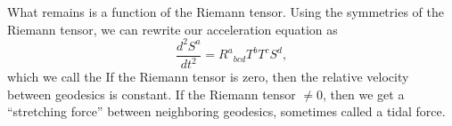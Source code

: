 What remains is a function of the Riemann tensor. Using the symmetries of the Riemann tensor, we can rewrite our acceleration equation as
$$\frac{d^2S^a}{dt^2}={R^a}_{bcd} T^b T^c S^d,$$
which we call the  If the Riemann tensor is zero, then the relative velocity between geodesics is constant. If the Riemann tensor $\neq 0$, then we get a ``stretching force'' between neighboring geodesics, sometimes called a tidal force.